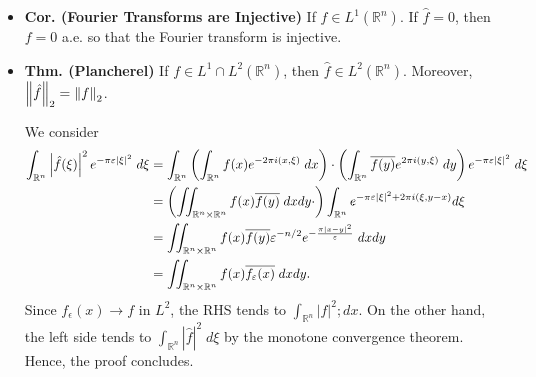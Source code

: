 \documentclass{article}
\begin{document}
\begin{itemize}
{\begin{quote}
			(\textbf{Step 2}) Now we pass to the limit $\epsilon \to 0$. In this limit, we know that $f_{\epsilon} \to f$ in $L^{1}$. On the other hand, we also know that by dominated convergence, 
			\begin{equation}
				\int_{\mathbb{R}^{n}}\hat{f}(\xi)e^{-\pi \epsilon |\xi|^{2}}e^{2\pi i (\xi, x)}\;d\xi \to \int_{\mathbb{R}^{n}}\hat{f}(\xi)e^{2\pi i (\xi,x)}\;d\xi, 
			\end{equation}
			so that 
			\begin{equation}
				f(x) = \int_{\mathbb{R}^{n}}\hat{f}(\xi)e^{2\pi i (\xi,x)}\;d\xi \quad \text{ a.e. $x \in \mathbb{R}^{n}$}. 
			\end{equation}
		\end{quote}
		Thus, the proof concludes. Essentially, the main idea was to convolve $f$ with a smoothing function, and then use dominated convergence to force the limits to work. 
	}
	
	\item \textbf{Cor. (Fourier Transforms are Injective)} If $f \in L^{1}(\mathbb{R}^{n})$. If $\hat{f} = 0$, then $f = 0$ a.e. so that the Fourier transform is injective. 
	
	\newpage 
	\item \textbf{Thm. (Plancherel)} If $f \in L^{1} \cap L^{2}(\mathbb{R}^{n})$, then $\hat{f} \in L^{2}(\mathbb{R}^{n})$. Moreover, $\left\Vert \hat{f} \right\Vert_{2} = \left\Vert f \right\Vert_{2}$. 
	
	{\color{blue}
		We consider 
		\begin{align}
			\begin{split}
				\int_{\mathbb{R}^{n}}\left| \hat{f}(\xi) \right|^{2}e^{-\pi \varepsilon |\xi|^{2}}\;d\xi &= \int_{\mathbb{R}^{n}}\left(\int_{\mathbb{R}^{n}}f(x)e^{-2\pi i (x, \xi)}\;dx\right) \cdot \left(\int_{\mathbb{R}^{n}}\overline{f(y)}e^{2\pi i (y, \xi)}\;dy\right)e^{-\pi \varepsilon |\xi|^{2}}\;d\xi \\
				&= \left(\iint_{\mathbb{R}^{n}\times \mathbb{R}^{n}}f(x)\overline{f(y)}\;dx dy \cdot \right)\int_{\mathbb{R}^{n}}e^{-\pi \varepsilon |\xi|^{2} + 2\pi i (\xi, y - x)}d\xi \\
				&= \iint_{\mathbb{R}^{n} \times \mathbb{R}^{n}}f(x)\overline{f(y)}\varepsilon^{-n/2}e^{-\frac{\pi|x - y|^{2}}{\varepsilon}}\;dx dy \\
				&= \iint_{\mathbb{R}^{n} \times \mathbb{R}^{n}}f(x)\overline{f_{\varepsilon}(x)}\;dx dy. 
			\end{split}
		\end{align}
		Since $f_{\epsilon}(x) \to f$ in $L^{2}$, the RHS tends to $\int_{\mathbb{R}^{n}}|f|^{2};dx$. On the other hand, the left side tends to $\int_{\mathbb{R}^{n}}|\hat{f}|^{2}\;d\xi$ by the monotone convergence theorem. Hence, the proof concludes. 
		
	}
\end{itemize}
\end{document}
